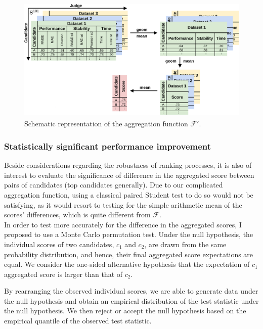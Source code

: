 \documentclass{article}
\begin{document}
\begin{figure}[ht]
    \centering
    \includegraphics[height=6cm,width=\textwidth,keepaspectratio]{fig/agg.png}
    \caption{Schematic representation of the aggregation function $\mathcal{F'}$.}
    \label{fig:agg}
\end{figure}

\subsubsection{Statistically significant performance improvement}\label{subsubsec:statistically-significant-performance-improvement}

Beside considerations regarding the robustness of ranking processes, it is also of interest to evaluate the significance of difference in the aggregated score between pairs of candidates (top candidates generally).
Due to our complicated aggregation function, using a classical paired Student test to do so would not be satisfying, as it would resort to testing for the simple arithmetic mean of the scores' differences, which is quite different from $\mathcal{F}$. \\

In order to test more accurately for the difference in the aggregated scores, I proposed to use a  Monte Carlo permutation test.
Under the null hypothesis, the individual scores of two candidates, $c_1$ and $c_2$, are drawn from the same probability distribution, and hence, their final aggregated score expectations are equal.
We consider the one-sided alternative hypothesis that the expectation of $c_1$ aggregated score is larger than that of $c_2$.

By rearranging the observed individual scores, we are able to generate data under the null hypothesis and obtain an empirical distribution of the test statistic under the null hypothesis.
We then reject or accept the null hypothesis based on the empirical quantile of the observed test statistic.
\end{document}
